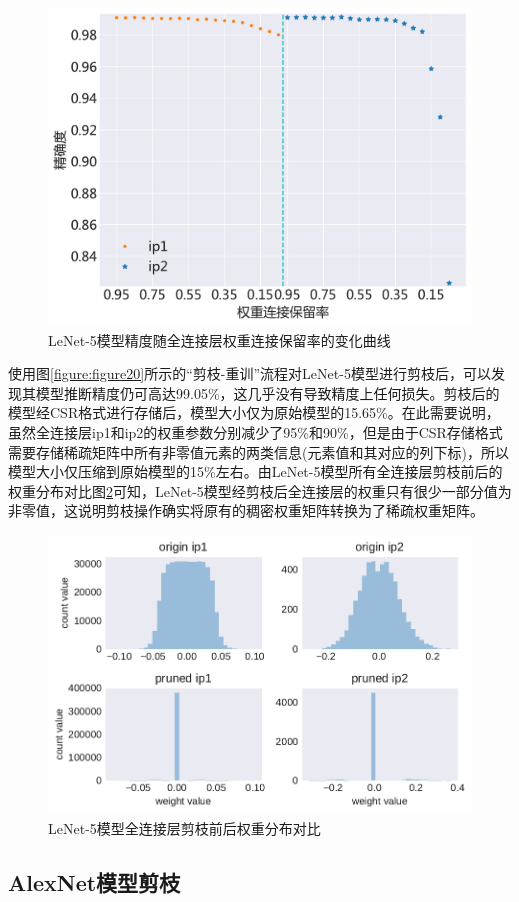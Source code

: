 \begin{figure}[htbp]
    \centering
    \includegraphics[height=0.4\textwidth]{figures/lenet_pruned_threshold.pdf}
    \caption{LeNet-5模型精度随全连接层权重连接保留率的变化曲线}\label{figure:figure21}
\end{figure}

使用图\ref{figure:figure20}所示的“剪枝-重训”流程对LeNet-5模型进行剪枝后，可以发现其模型推断精度仍可高达99.05\%，这几乎没有导致精度上任何损失。剪枝后的模型经CSR格式进行存储后，模型大小仅为原始模型的15.65\%。在此需要说明，虽然全连接层ip1和ip2的权重参数分别减少了95\%和90\%，但是由于CSR存储格式需要存储稀疏矩阵中所有非零值元素的两类信息(元素值和其对应的列下标)，所以模型大小仅压缩到原始模型的15\%左右。由LeNet-5模型所有全连接层剪枝前后的权重分布对比图\ref{figure:figure22}可知，LeNet-5模型经剪枝后全连接层的权重只有很少一部分值为非零值，这说明剪枝操作确实将原有的稠密权重矩阵转换为了稀疏权重矩阵。

\begin{figure}[htbp]
    \centering
    \includegraphics[height=0.41\textwidth]{figures/lenet_pruned_weights.pdf}
    \caption{LeNet-5模型全连接层剪枝前后权重分布对比}\label{figure:figure22}
\end{figure}


\subsection{AlexNet模型剪枝}

